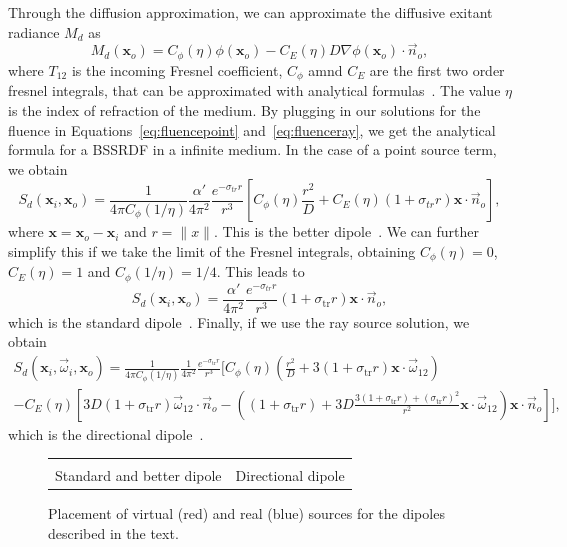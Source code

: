 Through the diffusion approximation, we can approximate the diffusive exitant radiance $M_d$ as
\begin{equation*}
M_d(\mathbf{x}_o) =  C_\phi(\eta) \phi(\mathbf{x}_o) - C_E(\eta) D \nabla\phi(\mathbf{x}_o) \cdot \vec{n}_o,
\end{equation*}
where $T_{12}$ is the incoming Fresnel coefficient, $C_\phi$ amnd $C_E$ are the first two order fresnel integrals, that can be approximated with analytical formulas~\cite{dEon2011}. The value $\eta$ is the index of refraction of the medium. By plugging in our solutions for the fluence in Equations~\ref{eq:fluencepoint} and~\ref{eq:fluenceray}, we get the analytical formula for a BSSRDF in a infinite medium. In the case of a point source term, we obtain
\begin{equation*}
S_d(\mathbf{x}_i, \mathbf{x}_o)  = \frac{1}{4\pi C_\phi(1/\eta)} \frac{\alpha'}{4 \pi^2} \frac{e^{-\sigma_{tr} r}}{r^3} \left[ C_\phi(\eta) \frac{r^2}{D} + C_E(\eta) (1 + \sigma_{tr} r) \mathbf{x} \cdot \vec{n}_o \right],
\end{equation*}
where $\mathbf{x} = \mathbf{x}_o - \mathbf{x}_i$ and $r = \|x\|$. This is the better dipole~\cite{dEon2012}. We can further simplify this if we take the limit of the Fresnel integrals, obtaining $C_\phi(\eta) = 0$, $C_E(\eta) = 1$ and $C_\phi(1/\eta) = 1/4$. This leads to
\begin{equation*}
S_d(\mathbf{x}_i, \mathbf{x}_o)  =  \frac{\alpha'}{4 \pi^2} \frac{e^{-\sigma_{tr} r}}{r^3} (1 + \sigma_\text{tr} r) \mathbf{x} \cdot \vec{n}_o,
\end{equation*}
which is the standard dipole~\cite{Jensen2001}. Finally, if we use the ray source solution, we obtain
\begin{multline*}
S_d(\mathbf{x}_i, \vec{\omega}_i, \mathbf{x}_o)  = \frac{1}{4\pi C_\phi(1/\eta)} \frac{1}{4 \pi^2} \frac{e^{-\sigma_\text{tr} r}}{r^3} \bigg[ C_\phi(\eta) (\frac{r^2}{D} +  3 (1 + \sigma_\text{tr} r) \mathbf{x}\cdot\vec{\omega}_{12} ) \\ - C_E(\eta) \left[3D (1 + \sigma_\text{tr} r) \vec{\omega}_{12} \cdot \vec{n}_o - \left((1 + \sigma_\text{tr} r) + 3D \frac{3 (1 + \sigma_\text{tr} r)  + (\sigma_\text{tr} r)^2}{r^2}\mathbf{x}\cdot\vec{\omega}_{12}\right) \mathbf{x} \cdot \vec{n}_o\right] \bigg],
\end{multline*}
which is the directional dipole~\cite{Frisvad2014}. 

\begin{figure}
\centering
\begin{tabular}{@{}c@{\hskip 1em}c@{}}
\def\svgwidth{0.5\textwidth} &  \def\svgwidth{0.5\textwidth} \\
Standard and better dipole &  Directional dipole \\
\end{tabular}
\caption{Placement of virtual (red) and real (blue) sources for the dipoles described in the text.} 
\label{fig:bssrdfsources}
\end{figure}


